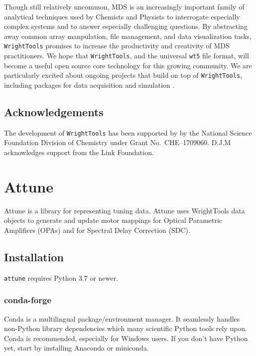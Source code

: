 Though still relatively uncommon, MDS is an increasingly important
family of analytical techniques used by Chemists and Physists to
interrogate especially complex systems and to answer especially
challenging questions. By abstracting away common array manpulation,
file management, and data visualization tasks, \texttt{WrightTools}
promises to increase the productivity and creativity of MDS
practitioners. We hope that \texttt{WrightTools}, and the universal
\texttt{wt5} file format, will become a useful open source core
technology for this growing community. We are particularly excited about
ongoing projects that build on top of \texttt{WrightTools}, including
packages for data acquisition and simulation
\cite{ThompsonBlaiseJonathan2018PyCMDS}\cite{SundenKyleFoster2018a}.

\hypertarget{acknowledgements}{%
\subsection{Acknowledgements}\label{acknowledgements}}

The development of \texttt{WrightTools} has been supported by by the
National Science Foundation Division of Chemistry under Grant
No.~CHE--1709060. D.J.M acknowledges support from the Link Foundation.

\clearpage

\section{Attune}  %

Attune is a library for representing tuning data.
Attune uses WrightTools data objects to generate and update motor mappings for Optical Parametric Amplifiers (OPAs) and for Spectral Delay Correction (SDC).

\subsection{Installation}\label{install}

\texttt{attune} requires Python 3.7 or newer.

\hypertarget{conda-forge}{%
\subsubsection{conda-forge}\label{conda-forge}}

Conda\cite{conda} is a multilingual
package/environment manager. It seamlessly handles non-Python library
dependencies which many scientific Python tools rely upon. Conda is
recommended, especially for Windows users. If you don't have Python yet,
start by installing Anaconda\cite{anaconda}
or miniconda\cite{miniconda}.

